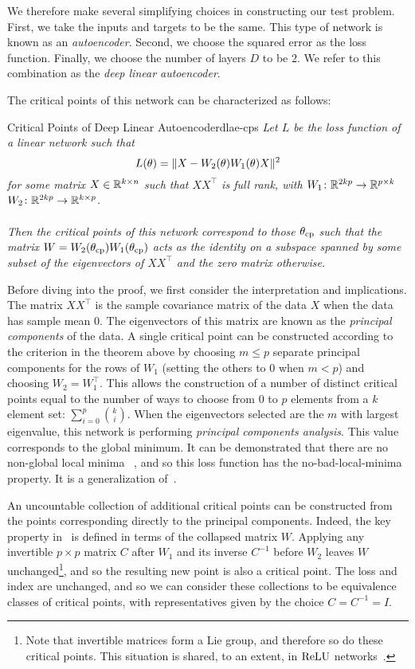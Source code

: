 \documentclass[../../thesis.tex]{subfiles}
\begin{document}
We therefore make several simplifying choices
in constructing our test problem.
First, we take the inputs and targets
to be the same.
This type of network is known as an \emph{autoencoder}.
Second, we choose the squared error as the loss function.
Finally, we choose the number of layers $D$ to be $2$.
We refer to this combination as the \emph{deep linear autoencoder}.

The critical points of this network can be characterized as follows:
\begin{theorem}{Critical Points of Deep Linear Autoencoder}{dlae-cps}
	\emph{%
	Let $L$ be the loss function of a linear network such that
	\begin{equation}
		L(\theta) = \lVert X - W_2(\theta)W_1(\theta) X\rVert^2
	\end{equation}
	\noindent for some matrix $X\in\mathbb{R}^{k\times n}$
	such that $XX^\top$ is full rank,
	with $W_1\colon \mathbb{R}^{2kp}\to \mathbb{R}^{p\times k}$
	$W_2\colon \mathbb{R}^{2kp}\to \mathbb{R}^{k \times p}$.
	\\ \ \\
	Then the critical points of this network
	correspond to those $\theta_{\mathrm{cp}}$
	such that the matrix
	$W = W_2(\theta_{\mathrm{cp}})W_1(\theta_{\mathrm{cp}})$
	acts as the identity on a subspace
	spanned by some subset of the eigenvectors of $XX^\top$
	and the zero matrix otherwise.
	}
\end{theorem}

Before diving into the proof,
we first consider the interpretation and implications.
The matrix $XX^\top$ is the
sample covariance matrix of the data $X$
when the data has sample mean $0$.
The eigenvectors of this matrix are known as the
\emph{principal components}
of the data.
A single critical point can be constructed
according to the criterion in the theorem above
by choosing $m \leq p$ separate principal components
for the rows of $W_1$
(setting the others to $0$ when $m<p$)
and choosing $W_2 = W_1^\top$.
This allows the construction of
a number of distinct critical points equal to the number of ways
to choose from $0$ to $p$ elements
from a $k$ element set:
$\sum_{i=0}^p \binom{k}{i}$.
When the eigenvectors selected are the $m$
with largest eigenvalue,
this network is performing \emph{principal components analysis}.
This value corresponds to the global minimum.
It can be demonstrated that there are no non-global local minima%
~\cite{baldi1989,laurent2018},
and so this loss function has the no-bad-local-minima property.
It is a generalization of~.

An uncountable collection of additional critical points
can be constructed from the points corresponding directly
to the principal components.
Indeed, the key property in~
is defined in terms of the collapsed matrix $W$.
Applying any invertible $p\times p$ matrix $C$ after $W_1$
and its inverse $C^{-1}$ before $W_2$
leaves $W$ unchanged\footnote{%
Note that invertible matrices form a Lie group,
and therefore so do these critical points.
This situation is shared, to an extent,
in $\mathrm{ReLU}$ networks~\cite{freeman2016}.},
and so the resulting new point is also a critical point.
The loss and index are unchanged,
and so we can consider these collections
to be equivalence classes of critical points,
with representatives given by the choice $C=C^{-1}=I$.
\end{document}
